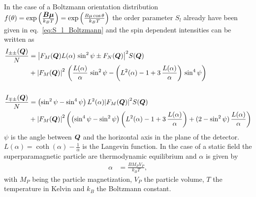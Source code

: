 In the case of a Boltzmann orientation distribution
$f(\theta)=\exp\left(\frac{\mbox{\boldmath$B\mu$}}{k_BT}\right)=\exp\left(\frac{B\mu\cos\theta}{k_BT}\right)$
the order parameter $S_l$ already have been given in eq.\
\ref{eq:S_l_Boltzmann} and the spin dependent intensities can be
written as
\begin{subequations}
\begin{align}
\frac{I_{\pm\pm}(\mbox{\boldmath$Q$})}{N} &= {\left\vert F_M(\mbox{\boldmath$Q$})
L(\alpha)\,\sin^2\psi
     \pm F_N(\mbox{\boldmath$Q$})\right\vert}^2 S(\mbox{\boldmath$Q$}) \\
&+ {\left\vert F_M(\mbox{\boldmath$Q$})\right\vert}^2\, \left( \frac{L(\alpha)}{\alpha}\,
\sin^2\psi - \left( L^2(\alpha)-1+3\,\frac{L(\alpha)}{\alpha}\right)
\, \sin^4\psi \right) \nonumber \\
\nonumber \\
\frac{I_{\mp\pm}(\mbox{\boldmath$Q$})}{N} &= \left( \sin^2\psi - \sin^4\psi
\right) L^2(\alpha)
{\left\vert F_M(\mbox{\boldmath$Q$})\right\vert}^2 S(\mbox{\boldmath$Q$}) \\
&+ {\left\vert F_M(\mbox{\boldmath$Q$})\right\vert}^2  \left( \left( \sin^4\psi-\sin^2\psi \right)
\left( L^2(\alpha)-1+3\, \frac{L(\alpha)}{\alpha}\right) +
(2-\sin^2\psi)\, \frac{L(\alpha)}{\alpha}\right) \nonumber
\end{align}
\end{subequations}
$\psi$ is the angle between $\mbox{\boldmath$Q$}$ and the horizontal axis in the
plane of the detector. $L(\alpha)=\coth(\alpha)-\frac{1}{\alpha}$ is
the Langevin function. In the case of a static field the
superparamagnetic particle are thermodynamic equilibrium and
$\alpha$ is given by
\begin{align}
\alpha&=\frac{BM_PV_P}{k_B T},
\end{align}
with $M_P$ being the particle magnetization, $V_P$ the particle
volume, $T$ the temperature in Kelvin and $k_B$ the Boltzmann
constant.
\clearpage 